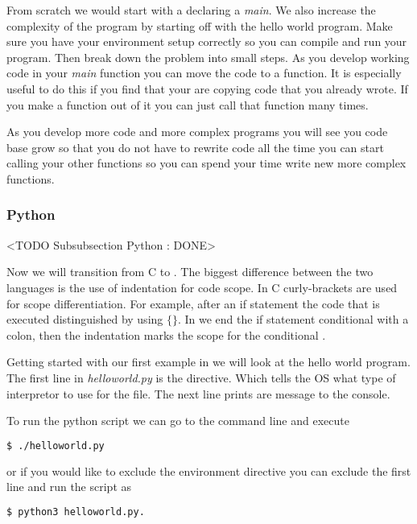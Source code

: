 From scratch we would start with a declaring a \emph{main}. We also increase the complexity of the program by starting off with the hello world program. Make sure you have your environment setup correctly so you can compile and run your program. Then break down the problem into small steps. As you develop working code in your \emph{main} function you can move the code to a function. It is especially useful to do this if you find that your are copying code that you already wrote. If you make a function out of it you can just call that function many times. 

As you develop more code and more complex programs you will see you code base grow so that you do not have to rewrite code all the time you can start calling your other functions so you can spend your time write new more complex functions. 

\subsubsection{Python}
	<TODO Subsubsection  Python : DONE>

Now we will transition from C to . The biggest difference between the two languages is the use of indentation for code scope. In C curly-brackets are used for scope differentiation. For example, after an if statement the code that is executed distinguished by using $\{\}$. In  we end the if statement conditional with a colon, then the indentation marks the scope for the conditional \cite{pyref}. 

Getting started with our first example in  we will look at the hello world program. The first line in \emph{helloworld.py} is the directive. Which tells the \ac{OS} what type of interpretor to use for the file. The next line prints are message to the console. 



To run the python script we can go to the command line and execute

\begin{lstlisting}[language=bash]
    $ ./helloworld.py
\end{lstlisting}

or if you would like to exclude the environment directive you can exclude the first line and run the script as

\begin{lstlisting}[language=bash]
    $ python3 helloworld.py.
\end{lstlisting}

